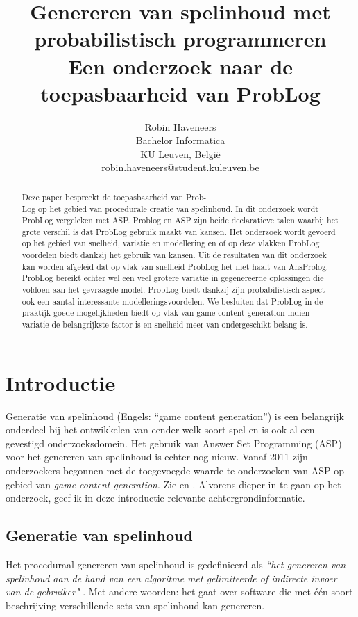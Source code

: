 \documentclass{article}
\title{Genereren van spelinhoud met probabilistisch programmeren \\ \Large{Een onderzoek naar de toepasbaarheid van ProbLog}}
\author{Robin Haveneers \\
Bachelor Informatica\\
KU Leuven, Belgi\"e \\
robin.haveneers@student.kuleuven.be}
\begin{document}
\maketitle

\begin{abstract}
Deze paper bespreekt de toepasbaarheid van Prob-\\Log op het gebied van procedurale creatie van spelinhoud. In dit onderzoek wordt ProbLog vergeleken met ASP. Problog en ASP zijn beide declaratieve talen waarbij het grote verschil is dat ProbLog gebruik maakt van kansen. Het onderzoek wordt gevoerd op het gebied van snelheid, variatie en modellering en of op deze vlakken ProbLog voordelen biedt dankzij het gebruik van kansen. Uit de resultaten van dit onderzoek kan worden afgeleid dat op vlak van snelheid ProbLog het niet haalt van AnsProlog. ProbLog bereikt echter wel een veel grotere variatie in gegenereerde oplossingen die voldoen aan het gevraagde model. ProbLog biedt dankzij zijn probabilistisch aspect ook een aantal interessante modelleringsvoordelen. We besluiten dat ProbLog in de praktijk goede mogelijkheden biedt op vlak van game content generation indien variatie de belangrijkste factor is en snelheid meer van ondergeschikt belang is.
\end{abstract}

\section{Introductie}
Generatie van spelinhoud (Engels: ``game content generation'') is een belangrijk onderdeel bij het ontwikkelen van eender welk soort spel en is ook al een gevestigd onderzoeksdomein. Het gebruik van Answer Set Programming (ASP) voor het genereren van spelinhoud is echter nog nieuw. Vanaf 2011 zijn onderzoekers begonnen met de toegevoegde waarde te onderzoeken van ASP op gebied van \textit{game content generation}. Zie \cite{yannakakis} en \cite{smith}. Alvorens dieper in te gaan op het onderzoek, geef ik in deze introductie relevante achtergrondinformatie.

	\subsection{Generatie van spelinhoud}
	Het proceduraal genereren van spelinhoud is gedefinieerd als \textit{``het genereren van spelinhoud aan de hand van een algoritme met gelimiteerde of indirecte invoer van de gebruiker"} \cite{togelius2015introduction}. Met andere woorden: het gaat over software die met \'e\'en soort beschrijving verschillende sets van spelinhoud kan genereren.
	
\end{document}
